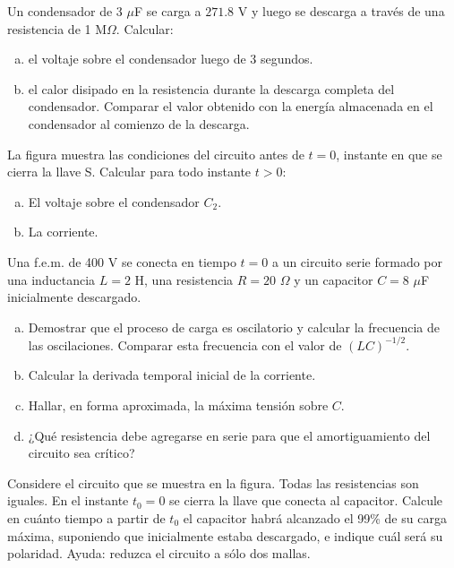 \documentclass[problemas]{guia}
\begin{document}
\begin{problema}{}
    Un condensador de 3 $\mu$F se carga a $271.8$ V y luego se descarga a 
    través de una resistencia de 1 M$\Omega$. Calcular:
    \begin{enumerate}[(a)]
        \item el voltaje sobre el condensador luego de 3 segundos.
        \item el calor disipado en la resistencia durante la descarga completa 
            del condensador. Comparar el valor obtenido con la energía 
            almacenada en el condensador al comienzo de la descarga.
    \end{enumerate}
\end{problema} 

\begin{problema}{}
    La figura muestra las condiciones del circuito antes de $t=0$, instante en
    que se cierra la llave S. Calcular para todo instante $t > 0$:
    \begin{enumerate}[(a)]
        \item El voltaje sobre el condensador $C_2$.
        \item La corriente.
    \end{enumerate}
\end{problema} 

\begin{problema}{}
    Una f.e.m. de 400 V se conecta en tiempo $t = 0$ a un circuito serie 
    formado por una inductancia $L = 2$ H, una resistencia $R = 20$ $\Omega$
    y un capacitor $C = 8$ $\mu$F inicialmente descargado.
    \begin{enumerate}[(a)]
        \item Demostrar que el proceso de carga es oscilatorio y calcular la 
            frecuencia de las oscilaciones. Comparar esta frecuencia con el 
            valor de $(LC)^{-1/2}$.
        \item Calcular la derivada temporal inicial de la corriente.
        \item Hallar, en forma aproximada, la máxima tensión sobre $C$.
        \item ¿Qué resistencia debe agregarse en serie para que el 
            amortiguamiento del circuito sea crítico?
    \end{enumerate}
\end{problema} 

\begin{problema}{}
    Considere el circuito que se muestra en la figura. Todas las resistencias 
    son iguales. En el instante $t_0=0$ se cierra la llave que conecta al 
    capacitor. Calcule en cuánto tiempo a partir de $t_0$ el capacitor habrá 
    alcanzado el 99\% de su carga máxima, suponiendo que inicialmente estaba 
    descargado, e indique cuál será su polaridad. Ayuda: reduzca el circuito a
    sólo dos mallas.
\end{problema} 
\end{document}
